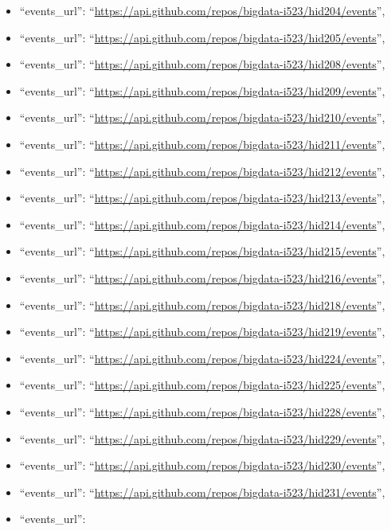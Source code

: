 \begin{itemize}
\item
  ``events\_url'':
  ``\url{https://api.github.com/repos/bigdata-i523/hid204/events}'',
\item
  ``events\_url'':
  ``\url{https://api.github.com/repos/bigdata-i523/hid205/events}'',
\item
  ``events\_url'':
  ``\url{https://api.github.com/repos/bigdata-i523/hid208/events}'',
\item
  ``events\_url'':
  ``\url{https://api.github.com/repos/bigdata-i523/hid209/events}'',
\item
  ``events\_url'':
  ``\url{https://api.github.com/repos/bigdata-i523/hid210/events}'',
\item
  ``events\_url'':
  ``\url{https://api.github.com/repos/bigdata-i523/hid211/events}'',
\item
  ``events\_url'':
  ``\url{https://api.github.com/repos/bigdata-i523/hid212/events}'',
\item
  ``events\_url'':
  ``\url{https://api.github.com/repos/bigdata-i523/hid213/events}'',
\item
  ``events\_url'':
  ``\url{https://api.github.com/repos/bigdata-i523/hid214/events}'',
\item
  ``events\_url'':
  ``\url{https://api.github.com/repos/bigdata-i523/hid215/events}'',
\item
  ``events\_url'':
  ``\url{https://api.github.com/repos/bigdata-i523/hid216/events}'',
\item
  ``events\_url'':
  ``\url{https://api.github.com/repos/bigdata-i523/hid218/events}'',
\item
  ``events\_url'':
  ``\url{https://api.github.com/repos/bigdata-i523/hid219/events}'',
\item
  ``events\_url'':
  ``\url{https://api.github.com/repos/bigdata-i523/hid224/events}'',
\item
  ``events\_url'':
  ``\url{https://api.github.com/repos/bigdata-i523/hid225/events}'',
\item
  ``events\_url'':
  ``\url{https://api.github.com/repos/bigdata-i523/hid228/events}'',
\item
  ``events\_url'':
  ``\url{https://api.github.com/repos/bigdata-i523/hid229/events}'',
\item
  ``events\_url'':
  ``\url{https://api.github.com/repos/bigdata-i523/hid230/events}'',
\item
  ``events\_url'':
  ``\url{https://api.github.com/repos/bigdata-i523/hid231/events}'',
\item
  ``events\_url'':

\end{itemize}
